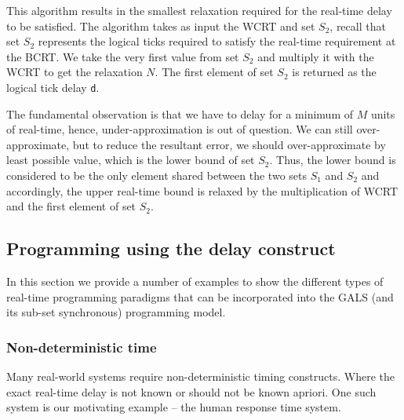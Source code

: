 This algorithm results in the smallest relaxation required for the
real-time delay to be satisfied. The algorithm takes as input the WCRT
and set $S_2$, recall that set $S_2$ represents the logical ticks
required to satisfy the real-time requirement at the BCRT. We take the
very first value from set $S_2$ and multiply it with the WCRT to get the
relaxation $N$. The first element of set $S_2$ is returned as the
logical tick delay \texttt{d}.

The fundamental observation is that we have to delay for a minimum of
$M$ units of real-time, hence, under-approximation is out of
question. We can still over-approximate, but to reduce the resultant
error, we should over-approximate by least possible value, which is the
lower bound of set $S_2$. Thus, the lower bound is considered to be the
only element shared between the two sets $S_1$ and $S_2$ and
accordingly, the upper real-time bound is relaxed by the multiplication
of WCRT and the first element of set $S_2$.


\subsection{Programming using the delay construct}
\label{sec:progr-using-delay}

In this section we provide a number of examples to show the different
types of real-time programming paradigms that can be incorporated into
the GALS (and its sub-set synchronous) programming model.

\subsubsection{Non-deterministic time}
\label{sec:non-determ-time}

Many real-world systems require non-deterministic timing
constructs. Where the exact real-time delay is not known or should not
be known apriori. One such system is our motivating example -- the human
response time system.


  
